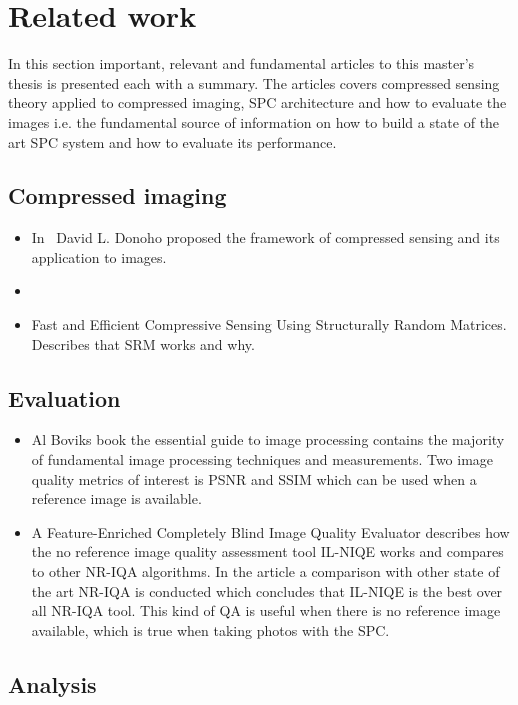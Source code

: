 \section{Related work}
In this section important, relevant and fundamental articles to this master's thesis is presented each with a summary. The articles covers compressed sensing theory applied to compressed imaging, SPC architecture and how to evaluate the images i.e. the fundamental source of information on how to build a state of the art SPC system and how to evaluate its performance. 

\subsection{Compressed imaging}
\begin{itemize}

    \item In~\cite{article:CS_donoho1} David L. Donoho proposed the framework of compressed sensing and its application to images.
    
    \item 

    \item \cite{article:SRM} Fast and Efficient Compressive Sensing Using Structurally Random Matrices. Describes that SRM works and why.

\end{itemize}


\subsection{Evaluation}

\begin{itemize}

    \item Al Boviks book the essential guide to image processing \cite{book:image_processing} contains the majority of fundamental image processing techniques and measurements. Two image quality metrics of interest is PSNR and SSIM which can be used when a reference image is available.
    
    \item \cite{article:il_niqe} A Feature-Enriched Completely Blind Image
    Quality Evaluator describes how the no reference image quality assessment tool IL-NIQE works and compares to other NR-IQA algorithms. In the article a comparison with other state of the art NR-IQA is conducted which concludes that IL-NIQE is the best over all NR-IQA tool. This kind of QA is useful when there is no reference image available, which is true when taking photos with the SPC.
    
    
    
\end{itemize}


\subsection{Analysis}